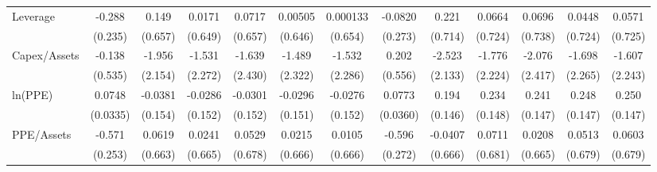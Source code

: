{\begin{tabular}{l*{12}{c}}
Leverage            &      -0.288         &       0.149         &      0.0171         &      0.0717         &     0.00505         &    0.000133         &     -0.0820         &       0.221         &      0.0664         &      0.0696         &      0.0448         &      0.0571         \\
                    &     (0.235)         &     (0.657)         &     (0.649)         &     (0.657)         &     (0.646)         &     (0.654)         &     (0.273)         &     (0.714)         &     (0.724)         &     (0.738)         &     (0.724)         &     (0.725)         \\
Capex/Assets        &      -0.138         &      -1.956         &      -1.531         &      -1.639         &      -1.489         &      -1.532         &       0.202         &      -2.523         &      -1.776         &      -2.076         &      -1.698         &      -1.607         \\
                    &     (0.535)         &     (2.154)         &     (2.272)         &     (2.430)         &     (2.322)         &     (2.286)         &     (0.556)         &     (2.133)         &     (2.224)         &     (2.417)         &     (2.265)         &     (2.243)         \\
ln(PPE)             &      0.0748\sym{**} &     -0.0381         &     -0.0286         &     -0.0301         &     -0.0296         &     -0.0276         &      0.0773\sym{**} &       0.194         &       0.234         &       0.241         &       0.248\sym{*}  &       0.250\sym{*}  \\
                    &    (0.0335)         &     (0.154)         &     (0.152)         &     (0.152)         &     (0.151)         &     (0.152)         &    (0.0360)         &     (0.146)         &     (0.148)         &     (0.147)         &     (0.147)         &     (0.147)         \\
PPE/Assets          &      -0.571\sym{**} &      0.0619         &      0.0241         &      0.0529         &      0.0215         &      0.0105         &      -0.596\sym{**} &     -0.0407         &      0.0711         &      0.0208         &      0.0513         &      0.0603         \\
                    &     (0.253)         &     (0.663)         &     (0.665)         &     (0.678)         &     (0.666)         &     (0.666)         &     (0.272)         &     (0.666)         &     (0.681)         &     (0.665)         &     (0.679)         &     (0.679)         \\

\end{tabular}}
